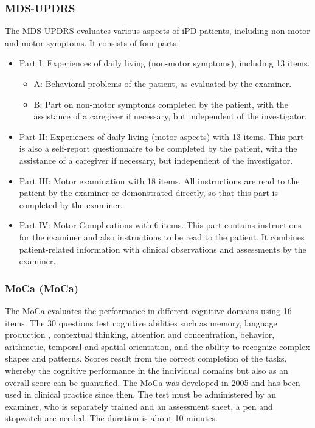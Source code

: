 \subsubsection{\acl{MDS-UPDRS}}
\label{questionnaires:updrs}
The \ac{MDS-UPDRS} \cite{goetz2007updrs} evaluates various aspects of \ac{iPD}-patients, including non-motor and motor symptoms. It consists of four parts:
\begin{itemize}
\item Part I: Experiences of daily living (non-motor symptoms), including 13 items.
\begin{itemize}
\item A: Behavioral problems of the patient, as evaluated by the examiner.
\item B: Part on non-motor symptoms completed by the patient, with the assistance of a caregiver if necessary, but independent of the investigator.
\end{itemize}
\item Part II: Experiences of daily living (motor aspects) with 13 items. This part is also a self-report questionnaire to be completed by the patient, with the assistance of a caregiver if necessary, but independent of the investigator.
\item Part III: Motor examination with 18 items. All instructions are read to the patient by the examiner or demonstrated directly, so that this part is completed by the examiner.
\item Part IV: Motor Complications with 6 items. This part contains instructions for the examiner and also instructions to be read to the patient. It combines patient-related information with clinical observations and assessments by the examiner.
\end{itemize}

\subsubsection{\acl{MoCa} (\acs{MoCa})}
\label{questionnaires:MoCa}
The \acl{MoCa} evaluates the performance in different cognitive domains using 16 items. The 30 questions test cognitive abilities such as memory, language production , contextual thinking, attention and concentration, behavior, arithmetic, temporal and spatial orientation, and the ability to recognize complex shapes and patterns. Scores result from the correct completion of the tasks, whereby the cognitive performance in the individual domains but also as an overall score can be quantified. The \ac{MoCa} was developed in 2005 \cite{nasreddine2005moca} and has been used in clinical practice since then. The test must be administered by an examiner, who is separately trained and an assessment sheet, a pen and stopwatch are needed. The duration is about 10 minutes.

